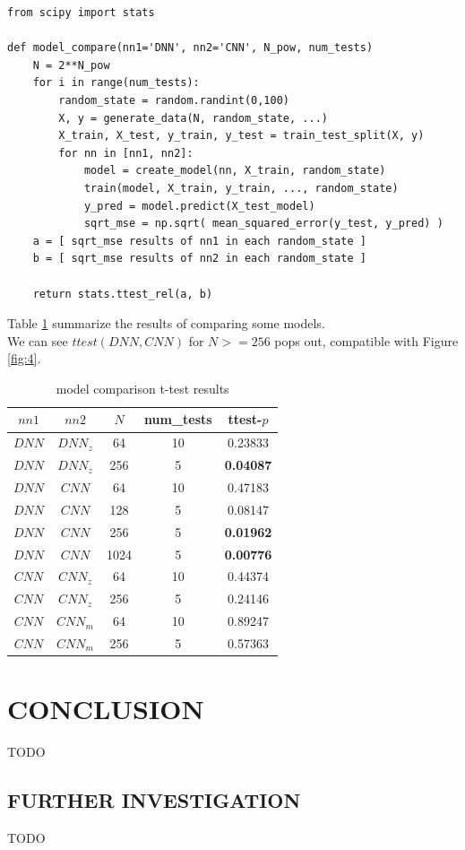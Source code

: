 \documentclass[a4paper, 12pt]{report}
\begin{document}
\begin{verbatim}
from scipy import stats

def model_compare(nn1='DNN', nn2='CNN', N_pow, num_tests)
    N = 2**N_pow
    for i in range(num_tests):
        random_state = random.randint(0,100)
        X, y = generate_data(N, random_state, ...)
        X_train, X_test, y_train, y_test = train_test_split(X, y)
        for nn in [nn1, nn2]:
            model = create_model(nn, X_train, random_state)
            train(model, X_train, y_train, ..., random_state)
            y_pred = model.predict(X_test_model)
            sqrt_mse = np.sqrt( mean_squared_error(y_test, y_pred) )
    a = [ sqrt_mse results of nn1 in each random_state ]
    b = [ sqrt_mse results of nn2 in each random_state ]

    return stats.ttest_rel(a, b)
\end{verbatim}

Table \ref{table:9} summarize the results of comparing some models.\\
We can see $ttest(DNN, CNN)$ for $N >= 256$ pops out, compatible with Figure \ref{fig:4}.

\begin{table}[h!]
    \scriptsize
    \centering
    \begin{tabular}{||c c c c c||} 
        \hline
        $nn1$ & $nn2$ & $N$ & num\_tests & ttest-$p$ \\ [0.5ex] 
        \hline\hline
        $DNN$ & $DNN_z$ & 64 & 10 & 0.23833 \\ 
        \hline
        $DNN$ & $DNN_z$ & 256 & 5 & \textbf{0.04087} \\ 
        \hline
        $DNN$ & $CNN$ & 64 & 10 & 0.47183 \\ 
        \hline
        $DNN$ & $CNN$ & 128 & 5 & 0.08147 \\ 
        \hline
        \rowcolor{yellow}
        $DNN$ & $CNN$ & 256 & 5 & \textbf{0.01962} \\ 
        \hline
        \rowcolor{yellow}
        $DNN$ & $CNN$ & 1024 & 5 & \textbf{0.00776} \\ 
        \hline
        $CNN$ & $CNN_z$ & 64 & 10 & 0.44374 \\ 
        \hline
        $CNN$ & $CNN_z$ & 256 & 5 & 0.24146 \\ 
        \hline
        $CNN$ & $CNN_m$ & 64 & 10 & 0.89247 \\ 
        \hline
        $CNN$ & $CNN_m$ & 256 & 5 & 0.57363 \\ 
        \hline
    \end{tabular}
    \caption{model comparison t-test results}
    \label{table:9}
\end{table}

\chapter{CONCLUSION}
TODO

\section{FURTHER INVESTIGATION}
TODO

\printbibliography
\end{document}
